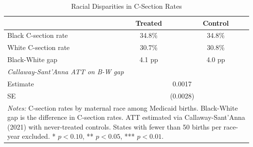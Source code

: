 \begin{table}[t]
\centering
\caption{Racial Disparities in C-Section Rates}
\label{tab:race}
\begin{tabular}{lcc}
\hline\hline
 & Treated & Control \\
\hline
Black C-section rate & 34.8\% & 34.8\% \\
White C-section rate & 30.7\% & 30.8\% \\
Black-White gap & 4.1 pp & 4.0 pp \\
\hline
\multicolumn{3}{l}{\textit{Callaway-Sant'Anna ATT on B-W gap}} \\
Estimate & \multicolumn{2}{c}{0.0017} \\
SE & \multicolumn{2}{c}{(0.0028)} \\
\hline\hline
\multicolumn{3}{p{0.75\textwidth}}{\footnotesize \textit{Notes:} C-section rates by maternal race among Medicaid births. Black-White gap is the difference in C-section rates. ATT estimated via Callaway-Sant'Anna (2021) with never-treated controls. States with fewer than 50 births per race-year excluded. * $p<0.10$, ** $p<0.05$, *** $p<0.01$.}
\end{tabular}
\end{table}

